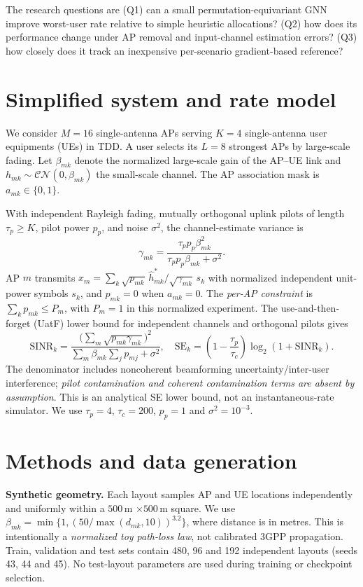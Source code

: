 \documentclass[10pt,a4paper]{article}
\newcommand{\sect}[1]{\vspace{3pt}\section{\color{navy}#1}}
\begin{document}
The research questions are (Q1) can a small permutation-equivariant GNN improve worst-user rate relative to simple heuristic allocations? (Q2) how does its performance change under AP removal and input-channel estimation errors? (Q3) how closely does it track an inexpensive per-scenario gradient-based reference?

\sect{Simplified system and rate model}
We consider $M=16$ single-antenna APs serving $K=4$ single-antenna user equipments (UEs) in TDD. A user selects its $L=8$ strongest APs by large-scale fading. Let $\beta_{mk}$ denote the normalized large-scale gain of the AP--UE link and $h_{mk}\sim\mathcal{CN}(0,\beta_{mk})$ the small-scale channel. The AP association mask is $a_{mk}\in\{0,1\}$.

With independent Rayleigh fading, mutually orthogonal uplink pilots of length $\tau_p\geq K$, pilot power $p_p$, and noise $\sigma^2$, the channel-estimate variance is
\begin{equation}\label{eq:gamma}
\gamma_{mk}=\frac{\tau_p p_p\beta_{mk}^2}{\tau_p p_p\beta_{mk}+\sigma^2}.
\end{equation}
AP $m$ transmits $x_m=\sum_k\sqrt{p_{mk}}\,\widehat h_{mk}^{*}/\sqrt{\gamma_{mk}}\,s_k$ with normalized independent unit-power symbols $s_k$, and $p_{mk}=0$ when $a_{mk}=0$. The \emph{per-AP constraint} is $\sum_k p_{mk}\leq P_m$, with $P_m=1$ in this normalized experiment. The use-and-then-forget (UatF) lower bound for independent channels and orthogonal pilots gives
\begin{equation}\label{eq:sinr}
\mathrm{SINR}_k = \frac{\bigl(\sum_m\sqrt{p_{mk}\gamma_{mk}}\bigr)^2}
{\sum_m\beta_{mk}\sum_jp_{mj}+\sigma^2},\quad
\mathrm{SE}_k=\left(1-\frac{\tau_p}{\tau_c}\right)\log_2(1+\mathrm{SINR}_k).
\end{equation}
The denominator includes noncoherent beamforming uncertainty/inter-user interference; \emph{pilot contamination and coherent contamination terms are absent by assumption}. This is an analytical SE lower bound, not an instantaneous-rate simulator. We use $\tau_p=4$, $\tau_c=200$, $p_p=1$ and $\sigma^2=10^{-3}$.

\sect{Methods and data generation}
\textbf{Synthetic geometry.} Each layout samples AP and UE locations independently and uniformly within a $500\,$m $\times 500\,$m square. We use $\beta_{mk}=\min\{1,(50/\max(d_{mk},10))^{3.2}\}$, where distance is in metres. This is intentionally a \emph{normalized toy path-loss law}, not calibrated 3GPP propagation. Train, validation and test sets contain 480, 96 and 192 independent layouts (seeds 43, 44 and 45). No test-layout parameters are used during training or checkpoint selection.
\end{document}
